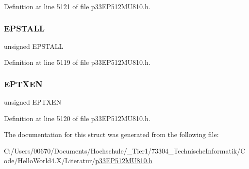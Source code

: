 Definition at line 5121 of file p33\+E\+P512\+M\+U810.\+h.

\mbox{\label{structtag_u1_e_p6_b_i_t_s_a47042104f04ebe06a23f9789bd400d7e}} 
\subsubsection{\texorpdfstring{E\+P\+S\+T\+A\+LL}{EPSTALL}}
{\footnotesize\ttfamily unsigned E\+P\+S\+T\+A\+LL}



Definition at line 5119 of file p33\+E\+P512\+M\+U810.\+h.

\mbox{\label{structtag_u1_e_p6_b_i_t_s_aa2d88c1be513e759c136823c86a355b4}} 
\subsubsection{\texorpdfstring{E\+P\+T\+X\+EN}{EPTXEN}}
{\footnotesize\ttfamily unsigned E\+P\+T\+X\+EN}



Definition at line 5120 of file p33\+E\+P512\+M\+U810.\+h.



The documentation for this struct was generated from the following file\+:\begin{DoxyCompactItemize}
\item 
C\+:/\+Users/00670/\+Documents/\+Hochschule/\+\_\+\+Tier1/73304\+\_\+\+Technische\+Informatik/\+Code/\+Hello\+World4.\+X/\+Literatur/\hyperlink{p33_e_p512_m_u810_8h}{p33\+E\+P512\+M\+U810.\+h}\end{DoxyCompactItemize}
